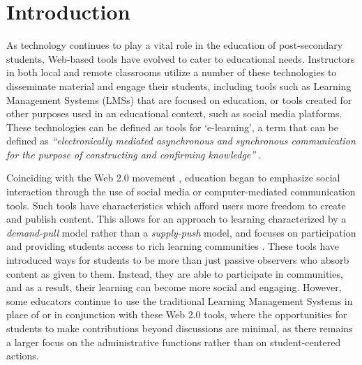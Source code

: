 \chapter{Introduction}



As technology continues to play a vital role in the education of post-secondary students, Web-based tools have evolved to cater to educational needs. Instructors in both local and remote classrooms utilize a number of these technologies to disseminate material and engage their students, including tools such as Learning Management Systems (LMSs) that are focused on education, or tools created for other purposes used in an educational context, such as social media platforms. These technologies can be defined as tools for `e-learning', a term that can be defined as \textit{``electronically mediated asynchronous and synchronous communication for the purpose of constructing and confirming knowledge''} \cite{garrison2011learning}.

Coinciding with the Web 2.0 movement \cite{O'Reilly-What-2005}, education began to emphasize social interaction through the use of social media or computer-mediated communication tools. Such tools have characteristics which afford users more freedom to create and publish content. This allows for an approach to learning characterized by a \emph{demand-pull} model rather than a \emph{supply-push} model, and focuses on participation and providing students access to rich learning communities \cite{seely2008open}. These tools have introduced ways for students to be more than just passive observers who absorb content as given to them. Instead, they are able to participate in communities, and as a result, their learning can become more social and engaging. However, some educators continue to use the traditional Learning Management Systems in place of or in conjunction with these Web 2.0 tools, where the opportunities for students to make contributions beyond discussions are minimal, as there remains a larger focus on the administrative functions rather than on student-centered actions.


